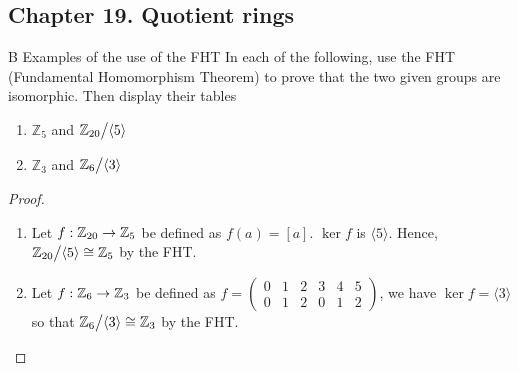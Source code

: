 \subsection*{Chapter 19. Quotient rings}


\begin{exercise}{B Examples of the use of the FHT}
In each of the following, use the FHT (Fundamental Homomorphism Theorem) to prove that the two given groups are isomorphic. Then display their tables
  \begin{enumerate}
      \item $\mathbb{Z}_{5}$ and ${\textstyle \mathbb{Z}_{20}}\big/{\textstyle \langle 5\rangle}$
      \item $\mathbb{Z}_{3}$ and ${\textstyle \mathbb{Z}_{6}}\big/{\textstyle \langle 3\rangle}$
  \end{enumerate}
\end{exercise}
\begin{proof}
 \begin{enumerate}
     \item Let $f:\mathbb{Z}_{20}\rightarrow\mathbb{Z}_{5}$ be defined as $f(a)=[a]$. $\ker f$ is $\langle 5\rangle$. Hence, ${\textstyle \mathbb{Z}_{20}}\big/{\textstyle \langle 5\rangle}\cong\mathbb{Z}_{5}$ by the FHT.
     \item Let $f:\mathbb{Z}_{6}\rightarrow\mathbb{Z}_{3}$ be defined as $f=
     \begin{pmatrix}
     0 & 1 & 2 & 3 & 4 & 5\\
     0 & 1 & 2 & 0 & 1 & 2
     \end{pmatrix}$, we have $\ker f=\langle 3 \rangle$ so that ${\textstyle \mathbb{Z}_{6}}\big/{\textstyle \langle 3\rangle}\cong\mathbb{Z}_{3}$ by the FHT.
 \end{enumerate}
\end{proof}


